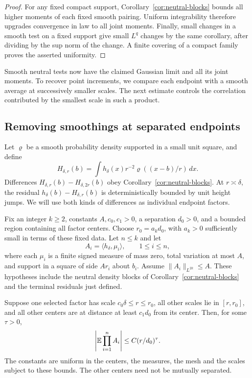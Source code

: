 \begin{proof}
For any fixed compact support, Corollary~\ref{cor:neutral-blocks} bounds
all higher moments of each fixed smooth pairing. Uniform integrability
therefore upgrades convergence in law to all joint moments. Finally,
small changes in a smooth test on a fixed support give small \(L^q\)
changes by the same corollary, after dividing by the sup norm of the
change. A finite covering of a compact family proves the asserted
uniformity.
\end{proof}

Smooth neutral tests now have the claimed Gaussian limit and all its
joint moments. To recover point increments, we compare each endpoint
with a smooth average at successively smaller scales. The next estimate
controls the correlation contributed by the smallest scale in such a
product.

\subsection{Removing smoothings at separated endpoints}

Let \(\varrho\) be a smooth probability density supported in a small
unit square, and define
\[
 H_{\delta,r}(b)=\int h_\delta(x)r^{-2}
                   \varrho((x-b)/r)\,dx.
\]
Differences \(H_{\delta,r}(b)-H_{\delta,2r}(b)\) obey
Corollary~\ref{cor:neutral-blocks}. At \(r\asymp\delta\), the residual
\(h_\delta(b)-H_{\delta,r}(b)\) is deterministically bounded by unit
height jumps. We will use both kinds of differences as individual
endpoint factors.

\begin{lemma}\label{lem:separated-block}
Fix an integer \(k\ge2\), constants \(A,c_0,c_1>0\), a separation
\(d_0>0\), and a bounded region containing all factor centers. Choose
\(r_0=a_kd_0\), with \(a_k>0\) sufficiently small in terms of these
fixed data. Let \(n\le k\) and let
\[
 A_i=\langle h_\delta,\mu_i\rangle,\qquad 1\le i\le n,
\]
where each \(\mu_i\) is a finite signed measure of mass zero, total
variation at most \(A\), and support in a square of side \(Ar_i\)
about \(b_i\). Assume \(\|A_i\|_{L^{2k}}\le A\). These hypotheses
include the neutral density blocks of Corollary~\ref{cor:neutral-blocks}
and the terminal residuals just defined.

Suppose one selected factor has scale \(c_0\delta\le r\le r_0\), all other
scales lie in \([r,r_0]\), and all other centers are at distance at
least \(c_1d_0\) from its center. Then, for some \(\tau>0\),
\begin{equation}\label{eq:prob-separated-block}
 \left|\mathbb E\prod_{i=1}^n A_i\right|
 \le C(r/d_0)^\tau.
\end{equation}
The constants are uniform in the centers, the measures, the mesh and
the scales subject to these bounds. The other centers need not be
mutually separated.
\end{lemma}

